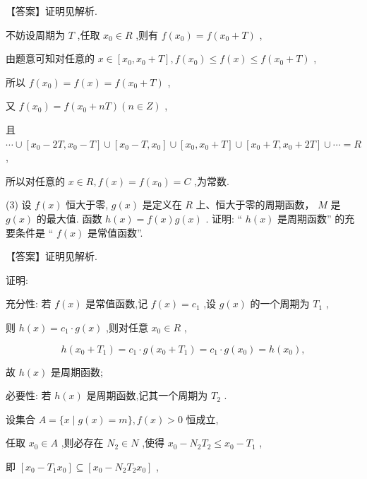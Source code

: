 \documentclass[10pt]{article}
\begin{document}
【答案】证明见解析.

不妨设周期为 \(T\) ,任取 \({x}_{0} \in  R\) ,则有 \(f\left( {x}_{0}\right)  = f\left( {{x}_{0} + T}\right)\) ,

由题意可知对任意的 \(x \in  \left\lbrack  {{x}_{0},{x}_{0} + T}\right\rbrack  ,f\left( {x}_{0}\right)  \leq  f\left( x\right)  \leq  f\left( {{x}_{0} + T}\right)\) ,

所以 \(f\left( {x}_{0}\right)  = f\left( x\right)  = f\left( {{x}_{0} + T}\right)\) ,

又 \(f\left( {x}_{0}\right)  = f\left( {{x}_{0} + {nT}}\right) \left( {n \in  Z}\right)\) ,

且 \(\cdots  \cup  \left\lbrack  {{x}_{0} - {2T},{x}_{0} - T}\right\rbrack   \cup  \left\lbrack  {{x}_{0} - T,{x}_{0}}\right\rbrack   \cup  \left\lbrack  {{x}_{0},{x}_{0} + T}\right\rbrack   \cup  \left\lbrack  {{x}_{0} + T,{x}_{0} + {2T}}\right\rbrack   \cup  \cdots  = R\) ,

所以对任意的 \(x \in  R,f\left( x\right)  = f\left( {x}_{0}\right)  = C\) ,为常数.

(3) 设 \(f\left( x\right)\) 恒大于零, \(g\left( x\right)\) 是定义在 \(R\) 上、恒大于零的周期函数， \(M\) 是 \(g\left( x\right)\) 的最大值. 函数 \(h\left( x\right)  = f\left( x\right) g\left( x\right)\) . 证明: “ \(h\left( x\right)\) 是周期函数” 的充要条件是 “ \(f\left( x\right)\) 是常值函数”.

【答案】证明见解析.

证明:

充分性: 若 \(f\left( x\right)\) 是常值函数,记 \(f\left( x\right)  = {c}_{1}\) ,设 \(g\left( x\right)\) 的一个周期为 \({T}_{1}\) ,

则 \(h\left( x\right)  = {c}_{1} \cdot  g\left( x\right)\) ,则对任意 \({x}_{0} \in  R\) ,

\[
h\left( {{x}_{0} + {T}_{1}}\right)  = {c}_{1} \cdot  g\left( {{x}_{0} + {T}_{1}}\right)  = {c}_{1} \cdot  g\left( {x}_{0}\right)  = h\left( {x}_{0}\right) ,
\]

故 \(h\left( x\right)\) 是周期函数;

必要性: 若 \(h\left( x\right)\) 是周期函数,记其一个周期为 \({T}_{2}\) .

设集合 \(A = \{ x \mid  g\left( x\right)  = m\} ,f\left( x\right)  > 0\) 恒成立,

任取 \({x}_{0} \in  A\) ,则必存在 \({N}_{2} \in  N\) ,使得 \({x}_{0} - {N}_{2}{T}_{2} \leq  {x}_{0} - {T}_{1}\) ,

即 \(\left\lbrack  {{x}_{0} - {T}_{1}{x}_{0}}\right\rbrack   \subseteq  \left\lbrack  {{x}_{0} - {N}_{2}{T}_{2}{x}_{0}}\right\rbrack\) ,
\end{document}
